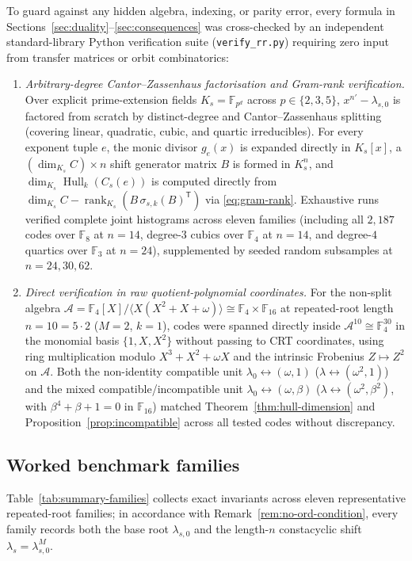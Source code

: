 \documentclass[preprint,12pt]{elsarticle}
\newcommand{\F}{\mathbb F}
\newcommand{\A}{\mathcal A}
\newcommand{\Hull}{\operatorname{Hull}}
\newcommand{\rank}{\operatorname{rank}}
\numberwithin{equation}{section}
\theoremstyle{plain}
\theoremstyle{definition}
\theoremstyle{remark}
\begin{document}
To guard against any hidden algebra, indexing, or parity error, every formula in
Sections~\ref{sec:duality}--\ref{sec:consequences} was cross-checked by an
independent standard-library Python verification suite (\texttt{verify\_rr.py})
requiring zero input from transfer matrices or orbit combinatorics:
\begin{enumerate}
\item \emph{Arbitrary-degree Cantor--Zassenhaus factorisation and Gram-rank
verification.} Over explicit prime-extension fields $K_s=\F_{p^d}$ across
$p\in\{2,3,5\}$, $x^{n'}-\lambda_{s,0}$ is factored from scratch by
distinct-degree and Cantor--Zassenhaus splitting (covering linear, quadratic,
cubic, and quartic irreducibles). For every exponent tuple $e$, the monic
divisor $g_e(x)$ is expanded directly in $K_s[x]$, a $(\dim_{K_s}C)\times n$ shift
generator matrix $B$ is formed in $K_s^n$, and $\dim_{K_s}\Hull_k(C_s(e))$ is
computed directly from $\dim_{K_s}C-\rank_{K_s}(B\,\sigma_{s,k}(B)^{\mathsf T})$
via \eqref{eq:gram-rank}. Exhaustive runs verified complete joint histograms across
 eleven families (including all $2{,}187$ codes over $\F_8$ at $n=14$, degree-$3$
cubics over $\F_4$ at $n=14$, and degree-$4$ quartics over $\F_3$ at $n=24$),
supplemented by seeded random subsamples at $n=24,30,62$.
\item \emph{Direct verification in raw quotient-polynomial coordinates.} For the
non-split algebra $\A=\F_4[X]/\langle X(X^2+X+\omega)\rangle\cong\F_4\times\F_{16}$
at repeated-root length $n=10=5\cdot 2$ ($M=2$, $k=1$), codes were spanned directly
inside $\A^{10}\cong\F_4^{30}$ in the monomial basis $\{1,X,X^2\}$ without
passing to CRT coordinates, using ring multiplication modulo $X^3+X^2+\omega X$
and the intrinsic Frobenius $Z\mapsto Z^2$ on $\A$. Both the non-identity
compatible unit $\lambda_0\leftrightarrow(\omega,1)$ ($\lambda\leftrightarrow
(\omega^2,1)$) and the mixed compatible/incompatible unit
$\lambda_0\leftrightarrow(\omega,\beta)$ ($\lambda\leftrightarrow(\omega^2,\beta^2)$,
with $\beta^4+\beta+1=0$ in $\F_{16}$) matched Theorem~\ref{thm:hull-dimension}
and Proposition~\ref{prop:incompatible} across all tested codes without discrepancy.
\end{enumerate}

\subsection{Worked benchmark families}\label{sec:benchmarks}

Table~\ref{tab:summary-families} collects exact invariants across eleven
representative repeated-root families; in accordance with
Remark~\ref{rem:no-ord-condition}, every family records both the base root
$\lambda_{s,0}$ and the length-$n$ constacyclic shift $\lambda_s=\lambda_{s,0}^M$.
\end{document}
